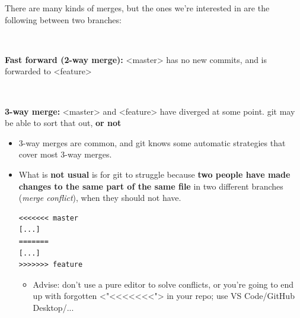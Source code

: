 \documentclass[dvipsnames]{beamer}
\def\texttt#1{<#1>}
\begin{document}
\begin{frame}
  \small

  There are many kinds of merges, but the ones we're interested in are the following between two branches:

  ~

\begin{minipage}[t]{0.49\textwidth}
  \footnotesize
  
  \begin{center}
    
  \end{center}

  \textbf{Fast forward (2-way merge):} \texttt{master} has no new commits, and is forwarded to \texttt{feature}
  
\end{minipage}~~~
\begin{minipage}[t]{0.49\textwidth}
  \footnotesize

  \begin{center}
    
  \end{center}

  \textbf{3-way merge:} \texttt{master} and \texttt{feature} have diverged at some point. git may be able to sort that out, \textbf{\color{red}or not}
  
\end{minipage}%

\end{frame}

\begin{frame}[fragile]
  \begin{minipage}{0.6\textwidth}
    \begin{itemize}
      \item 3-way merges are common, and git knows some automatic strategies that cover most 3-way merges.

      \item What is \textbf{not usual} is for git to struggle because \textbf{two people have made changes to the same part of the same file} in two different branches (\textit{merge conflict}), when they should not have.
      
      \begin{lstlisting}
<<<<<<< master
[...]
=======
[...]
>>>>>>> feature
      \end{lstlisting}

      \begin{itemize}
        \item Advise: don't use a pure editor to solve conflicts, or you're going to end up with forgotten \texttt{"<<<<<<<"} in your repo; use VS Code/GitHub Desktop/...
      \end{itemize}
      
    \end{itemize}
  \end{minipage}%
  \begin{minipage}{0.4\textwidth}
    \centering
    
  \end{minipage}
\end{frame}
\end{document}

